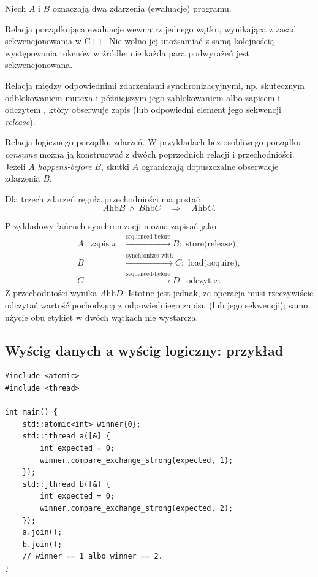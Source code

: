 Niech $A$ i $B$ oznaczają dwa zdarzenia (ewaluacje) programu.
\begin{description}[style=nextline]
\item[\emph{Sequenced-before}]
Relacja porządkująca ewaluacje wewnątrz jednego wątku, wynikająca z zasad
sekwencjonowania w C++. Nie wolno jej utożsamiać z samą kolejnością
występowania tokenów w źródle: nie każda para podwyrażeń jest sekwencjonowana.
\item[\emph{Synchronizes-with}]
Relacja między odpowiednimi zdarzeniami synchronizacyjnymi, np. skutecznym
odblokowaniem mutexa i późniejszym jego zablokowaniem albo zapisem
 i odczytem , który obserwuje zapis
(lub odpowiedni element jego sekwencji \emph{release}).
\item[\emph{Happens-before}]
Relacja logicznego porządku zdarzeń. W przykładach bez osobliwego
porządku \emph{consume} można ją konstruować z dwóch poprzednich
relacji i przechodniości. Jeżeli $A$ \emph{happens-before} $B$,
skutki $A$ ograniczają dopuszczalne obserwacje zdarzenia $B$.
\end{description}

Dla trzech zdarzeń reguła przechodniości ma postać
\[
 A\mathrel{\mathrm{hb}}B\ \land\ B\mathrel{\mathrm{hb}}C
 \quad\Longrightarrow\quad A\mathrel{\mathrm{hb}}C.
\]

Przykładowy łańcuch synchronizacji można zapisać jako
\[
\begin{aligned}
A:\text{ zapis }x
  &\xrightarrow{\mathrm{sequenced\mbox{-}before}}
    B:\text{ store(release)},\\
B&\xrightarrow{\mathrm{synchronizes\mbox{-}with}}
    C:\text{ load(acquire)},\\
C&\xrightarrow{\mathrm{sequenced\mbox{-}before}}
    D:\text{ odczyt }x.
\end{aligned}
\]
Z przechodniości wynika $A\mathrel{\mathrm{hb}}D$. Istotne jest jednak,
że operacja  musi rzeczywiście odczytać wartość pochodzącą
z odpowiedniego zapisu  (lub jego sekwencji); samo użycie
obu etykiet w dwóch wątkach nie wystarcza.

\subsection{Wyścig danych a wyścig logiczny: przykład}

\begin{lstlisting}[caption={Dwa atomiki eliminują data race, ale nie ustalają zwycięzcy.}]
#include <atomic>
#include <thread>

int main() {
    std::atomic<int> winner{0};
    std::jthread a([&] {
        int expected = 0;
        winner.compare_exchange_strong(expected, 1);
    });
    std::jthread b([&] {
        int expected = 0;
        winner.compare_exchange_strong(expected, 2);
    });
    a.join();
    b.join();
    // winner == 1 albo winner == 2.
}
\end{lstlisting}

